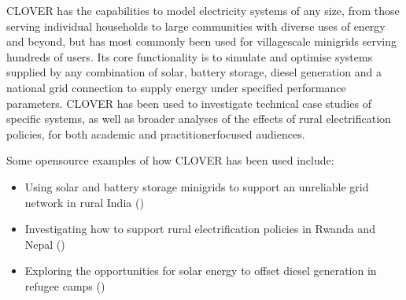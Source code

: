 \documentclass[letterpaper,10pt,english]{sphinxmanual}
\begin{document}
\sphinxAtStartPar
CLOVER has the capabilities to model electricity systems of any size,
from those serving individual households to large communities with
diverse uses of energy and beyond, but has most commonly been used for
village\sphinxhyphen{}scale minigrids serving hundreds of users. Its core
functionality is to simulate and optimise systems supplied by any
combination of solar, battery storage, diesel generation and a national
grid connection to supply energy under specified performance parameters.
CLOVER has been used to investigate technical case studies of specific
systems, as well as broader analyses of the effects of rural
electrification policies, for both academic and practitioner\sphinxhyphen{}focused
audiences.

\sphinxAtStartPar
Some open\sphinxhyphen{}source examples of how CLOVER has been used include:
\begin{itemize}
\item {} 
\sphinxAtStartPar
Using solar and battery storage minigrids to support an unreliable grid network in rural India ()

\item {} 
\sphinxAtStartPar
Investigating how to support rural electrification policies in Rwanda and Nepal ()

\item {} 
\sphinxAtStartPar
Exploring the opportunities for solar energy to offset diesel generation in refugee camps ()

\end{itemize}
\end{document}
